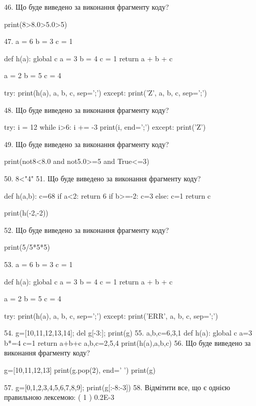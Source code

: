 \documentclass[11pt]{article}
\begin{document}
46. Що буде виведено за виконання фрагменту коду?

print(8>8.0>5.0>5)

47. 
a = 6
b = 3
c = 1

def h(a):
global c    a = 3
    b = 4
    c = 1
    return a + b + c

a = 2
b = 5
c = 4

try:
    print(h(a), a, b, c, sep=';')
except:
    print('Z', a, b, c, sep=';')

48. Що буде виведено за виконання фрагменту коду?

try:
    i = 12
    while i>6:
        i += -3
    print(i, end=';')
except:
    print('Z')


49. Що буде виведено за виконання фрагменту коду?

print(not8<8.0 and not5.0>=5 and True<=3)

50. 
8<"4"
51. Що буде виведено за виконання фрагменту коду?

def h(a,b):
    c=68
    if a<2:
        return 6
    if b>=-2:
         c=3
    else: 
        c=1
    return c

print(h(-2,-2))

52. Що буде виведено за виконання фрагменту коду?

print(5/5*5*5)

53. 
a = 6
b = 3
c = 1

def h(a):
global c    a = 3
    b = 4
    c = 1
    return a + b + c

a = 2
b = 5
c = 4

try:
    print(h(a), a, b, c, sep=';')
except:
    print('ERR', a, b, c, sep=';')

54. 
g=[10,11,12,13,14]; del g[-3:]; print(g)
55. 
a,b,c=6,3,1
    def h(a):
      global c      a=3
      b*=4
      c=1
      return a+b+c
    a,b,c=2,5,4
    print(h(a),a,b,c)
56. Що буде виведено за виконання фрагменту коду?

g=[10,11,12,13]
print(g.pop(2), end=' ')
print(g)


57. 
g=[0,1,2,3,4,5,6,7,8,9]; print(g[:-8:-3])
58. %
Відмітити все, що є однією правильною лексемою:
( 1 ) 0.2E-3
\end{document}
